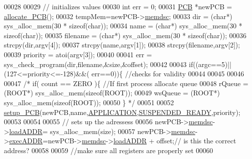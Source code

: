 \begin{DoxyCode}
00028         
00029         \textcolor{comment}{// initializes values}
00030         \textcolor{keywordtype}{int} err = 0;
00031         \hyperlink{structprocess}{PCB} *newPCB = \hyperlink{mpx__r2_8c_a58a8a1ea0a96b9ecf0be29179a5a0a1e}{allocate_PCB}();
00032         tempMem=newPCB->\hyperlink{structprocess_a163551ab7b60184b48e5d440fcd5c2b8}{memdsc};
00033         dir = (\textcolor{keywordtype}{char}*) sys\_alloc\_mem(30 * \textcolor{keyword}{sizeof}(\textcolor{keywordtype}{char}));
00034         name = (\textcolor{keywordtype}{char}*) sys\_alloc\_mem(30 * \textcolor{keyword}{sizeof}(\textcolor{keywordtype}{char}));
00035         filename = (\textcolor{keywordtype}{char}*) sys\_alloc\_mem(30 * \textcolor{keyword}{sizeof}(\textcolor{keywordtype}{char}));
00036         strcpy(dir,argv[4]);
00037         strcpy(name,argv[1]);
00038         strcpy(filename,argv[2]);
00039         priority = atoi(argv[3]);
00040         
00041         err = sys\_check\_program(dir,filename,&size,&offset); 
00042         
00043         \textcolor{keywordflow}{if}((argc==5)||(127<=priority<=-128)&&( err==0))\{ \textcolor{comment}{//checks for validity}
00044                 
00045                 
00046 
00047               \textcolor{comment}{/*        if( count == ZERO )\{ //If first process allocate queue}
00048 \textcolor{comment}{                        rQueue = (ROOT*) sys\_alloc\_mem(sizeof(ROOT));}
00049 \textcolor{comment}{                        wsQueue = (ROOT*) sys\_alloc\_mem(sizeof(ROOT));}
00050 \textcolor{comment}{                \}   */}
00051 
00052                 \hyperlink{mpx__r2_8c_a316c9619aba53c03c17afbc0a0dbf096}{setup_PCB}(newPCB,name,\hyperlink{mpx__r2_8h_a796bd7c6ba2e59281760fb155c6287e8}{APPLICATION},\hyperlink{mpx__r2_8h_a07b1141143e8825b04670da23fca8cc7}{SUSPENDED_READY},priority);
00053 
00054 
00055                 \textcolor{comment}{// sets up the adressess}
00056                 newPCB->\hyperlink{structprocess_a163551ab7b60184b48e5d440fcd5c2b8}{memdsc}->\hyperlink{structmem_a8f5a4db03ee0560e6bd4dd602ad753c0}{loadADDR}= sys\_alloc\_mem(size);
00057                 newPCB->\hyperlink{structprocess_a163551ab7b60184b48e5d440fcd5c2b8}{memdsc}->\hyperlink{structmem_a5340491e17307817e6dca3b1d260d18a}{execADDR}=newPCB->\hyperlink{structprocess_a163551ab7b60184b48e5d440fcd5c2b8}{memdsc}->\hyperlink{structmem_a8f5a4db03ee0560e6bd4dd602ad753c0}{loadADDR} + offset;\textcolor{comment}{// is 
      this the correct address? }
00058                 
00059                 \textcolor{comment}{//make sure all registers are properly set}
00060                 

\end{DoxyCode}
